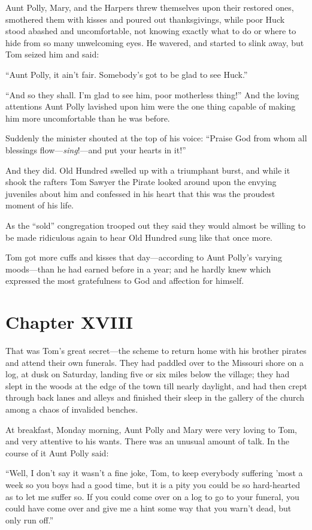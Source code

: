 \documentclass{book}
\begin{document}
Aunt Polly, Mary, and the Harpers threw themselves upon their restored ones, smothered them with kisses and poured out thanksgivings, while poor Huck stood abashed and uncomfortable, not knowing exactly what to do or where to hide from so many unwelcoming eyes. He wavered, and started to slink away, but Tom seized him and said:

“Aunt Polly, it ain’t fair. Somebody’s got to be glad to see Huck.”

“And so they shall. I’m glad to see him, poor motherless thing!” And the loving attentions Aunt Polly lavished upon him were the one thing capable of making him more uncomfortable than he was before.

Suddenly the minister shouted at the top of his voice: “Praise God from whom all blessings flow—\emph{sing}!—and put your hearts in it!”

And they did. Old Hundred swelled up with a triumphant burst, and while it shook the rafters Tom Sawyer the Pirate looked around upon the envying juveniles about him and confessed in his heart that this was the proudest moment of his life.

As the “sold” congregation trooped out they said they would almost be willing to be made ridiculous again to hear Old Hundred sung like that once more.

Tom got more cuffs and kisses that day—according to Aunt Polly’s varying moods—than he had earned before in a year; and he hardly knew which expressed the most gratefulness to God and affection for himself.

\chapter*{Chapter XVIII}

That was Tom’s great secret—the scheme to return home with his brother pirates and attend their own funerals. They had paddled over to the Missouri shore on a log, at dusk on Saturday, landing five or six miles below the village; they had slept in the woods at the edge of the town till nearly daylight, and had then crept through back lanes and alleys and finished their sleep in the gallery of the church among a chaos of invalided benches.

At breakfast, Monday morning, Aunt Polly and Mary were very loving to Tom, and very attentive to his wants. There was an unusual amount of talk. In the course of it Aunt Polly said:

“Well, I don’t say it wasn’t a fine joke, Tom, to keep everybody suffering ’most a week so you boys had a good time, but it is a pity you could be so hard-hearted as to let me suffer so. If you could come over on a log to go to your funeral, you could have come over and give me a hint some way that you warn’t dead, but only run off.”
\end{document}
